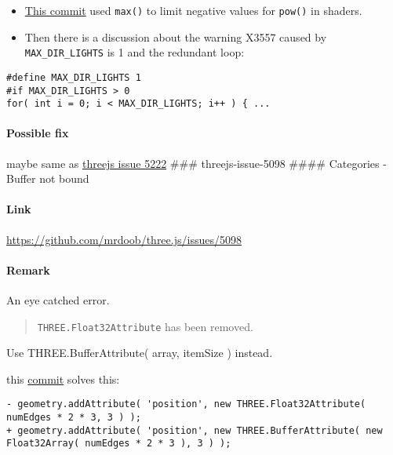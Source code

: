 \begin{itemize}
\item
  \href{https://github.com/Nimanf/three.js/commit/7f7650c5e012890a34c26c1c6fa2f8482d855627}{This
  commit} used \texttt{max()} to limit negative values for
  \texttt{pow()} in shaders.
\item
  Then there is a discussion about the warning X3557 caused by
  \texttt{MAX\_DIR\_LIGHTS} is 1 and the redundant loop:
\end{itemize}

\begin{verbatim}
#define MAX_DIR_LIGHTS 1
#if MAX_DIR_LIGHTS > 0
for( int i = 0; i < MAX_DIR_LIGHTS; i++ ) { ...
\end{verbatim}

\paragraph{Possible fix}\label{possible-fix}

maybe same as
\href{https://git.ustclug.org/VeriGL/VeriGL-Dark-Side/wikis/threejs-issue-5222}{threejs
issue 5222} \#\#\# threejs-issue-5098 \#\#\#\# Categories - Buffer not
bound

\paragraph{Link}\label{link-3}

\url{https://github.com/mrdoob/three.js/issues/5098}

\paragraph{Remark}\label{remark-3}

An eye catched error.

\begin{quote}
\texttt{THREE.Float32Attribute} has been removed.
\end{quote}

Use THREE.BufferAttribute( array, itemSize ) instead.

this
\href{https://github.com/mrdoob/three.js/commit/e5b1d38e1e90bc9f7b16da7c1e53e66c5e8c2178}{commit}
solves this:

\begin{verbatim}
- geometry.addAttribute( 'position', new THREE.Float32Attribute( numEdges * 2 * 3, 3 ) );
+ geometry.addAttribute( 'position', new THREE.BufferAttribute( new Float32Array( numEdges * 2 * 3 ), 3 ) );
\end{verbatim}

